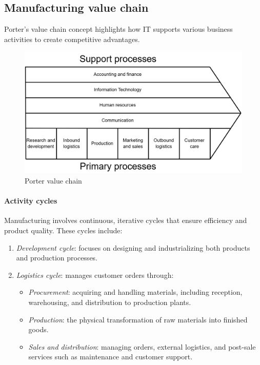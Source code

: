 \subsection{Manufacturing value chain}
Porter's value chain concept highlights how IT supports various business activities to create competitive advantages.
\begin{figure}[H]
    \centering
    \includegraphics[width=0.75\linewidth]{images/bis2.png}
    \caption{Porter value chain}
\end{figure}

\paragraph*{Activity cycles}
Manufacturing involves continuous, iterative cycles that ensure efficiency and product quality. 
These cycles include:
\begin{enumerate}
    \item \textit{Development cycle}: focuses on designing and industrializing both products and production processes.
    \item \textit{Logistics cycle}: manages customer orders through:
        \begin{itemize}
            \item \textit{Procurement}: acquiring and handling materials, including reception, warehousing, and distribution to production plants.
            \item \textit{Production}: the physical transformation of raw materials into finished goods.
            \item \textit{Sales and distribution}: managing orders, external logistics, and post-sale services such as maintenance and customer support.
        \end{itemize}
\end{enumerate}

